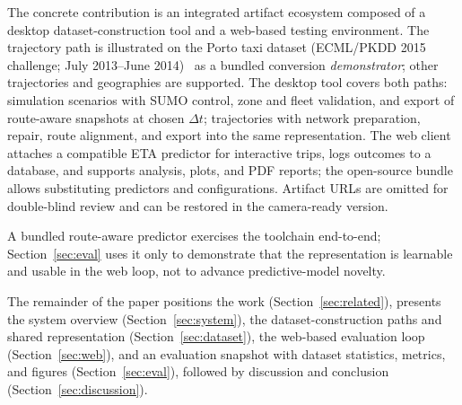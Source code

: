 The concrete contribution is an integrated artifact ecosystem composed of a desktop dataset-construction tool and a web-based testing environment.
The trajectory path is illustrated on the Porto taxi dataset (ECML/PKDD 2015 challenge; July 2013--June 2014)~\cite{porto2015pkdd} as a bundled conversion \emph{demonstrator}; other trajectories and geographies are supported. The desktop tool covers both paths: simulation scenarios with SUMO control, zone and fleet validation, and export of route-aware snapshots at chosen $\Delta t$; trajectories with network preparation, repair, route alignment, and export into the same representation. The web client attaches a compatible ETA predictor for interactive trips, logs outcomes to a database, and supports analysis, plots, and PDF reports; the open-source bundle allows substituting predictors and configurations. Artifact URLs are omitted for double-blind review and can be restored in the camera-ready version.

A bundled route-aware predictor exercises the toolchain end-to-end; Section~\ref{sec:eval} uses it only to demonstrate that the representation is learnable and usable in the web loop, not to advance predictive-model novelty.

The remainder of the paper positions the work (Section~\ref{sec:related}), presents the system overview (Section~\ref{sec:system}), the dataset-construction paths and shared representation (Section~\ref{sec:dataset}), the web-based evaluation loop (Section~\ref{sec:web}), and an evaluation snapshot with dataset statistics, metrics, and figures (Section~\ref{sec:eval}), followed by discussion and conclusion (Section~\ref{sec:discussion}).
